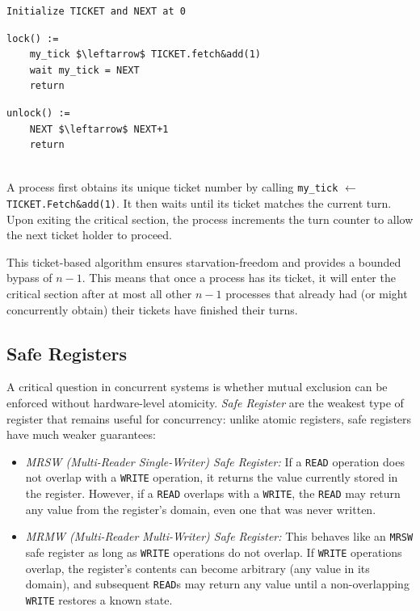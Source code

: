 \begin{minipage}{\textwidth}
\begin{lstlisting}[mathescape]
Initialize TICKET and NEXT at 0
\end{lstlisting}
\begin{minipage}{0.45\textwidth}
\begin{lstlisting}[mathescape]
lock() :=
    my_tick $\leftarrow$ TICKET.fetch&add(1)
    wait my_tick = NEXT
    return
\end{lstlisting}
\end{minipage}
\hfill
\begin{minipage}{0.45\textwidth}
\begin{lstlisting}[mathescape]
unlock() :=
    NEXT $\leftarrow$ NEXT+1
    return
\end{lstlisting}
\end{minipage}
\end{minipage}\\

A process first obtains its unique ticket number by calling \texttt{my\_tick} $\leftarrow$ \texttt{TICKET.Fetch\&add(1)}. It then waits until its ticket matches the current turn.
Upon exiting the critical section, the process increments the turn counter to allow the next ticket holder to proceed.
 
This ticket-based algorithm ensures starvation-freedom and provides a bounded bypass of $n-1$. This means that once a process has its ticket, it will enter the critical section after at most all other $n-1$ processes that already had (or might concurrently obtain) their tickets have finished their turns.

\subsection{Safe Registers}
A critical question in concurrent systems is whether mutual exclusion can be enforced without hardware-level atomicity. \textit{Safe Register} are the weakest type of register that remains useful for concurrency: unlike atomic registers, safe registers have much weaker guarantees:
\begin{itemize}
    \item  \textit{MRSW (Multi-Reader Single-Writer) Safe Register:} If a \texttt{READ} operation does not overlap with a \texttt{WRITE} operation, it returns the value currently stored in the register. However, if a \texttt{READ} overlaps with a \texttt{WRITE}, the \texttt{READ} may return any value from the register's domain, even one that was never written.
    \item \textit{MRMW (Multi-Reader Multi-Writer) Safe Register:} This behaves like an \texttt{MRSW} safe register as long as \texttt{WRITE} operations do not overlap. If \texttt{WRITE} operations overlap, the register's contents can become arbitrary (any value in its domain), and subsequent \texttt{READ}s may return any value until a non-overlapping \texttt{WRITE} restores a known state.
\end{itemize}

